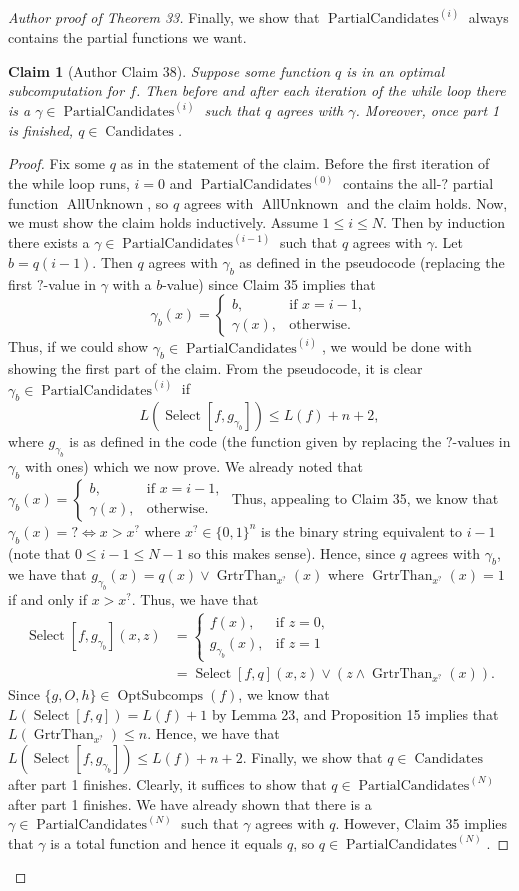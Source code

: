\documentclass[10pt,a4paper]{article}
\newtheorem{ntclaim}[nttheorem]{Claim}
\newcommand{\Opt}{\operatorname{OptSubcomps}}
\newcommand{\Select}{\operatorname{Select}}
\newcommand{\PC}[1]{\operatorname{PartialCandidates}^{(#1)}}
\newcommand{\Candidates}{\operatorname{Candidates}}
\begin{document}
\begin{proof}[Author proof of Theorem 33]
Finally, we show that $\PC{i}$ always contains the partial functions we want.
\begin{ntclaim}[Author Claim 38]
Suppose some function $q$ is in an optimal subcomputation for $f$. Then before and after each iteration of the while loop there is a $\gamma\in\PC{i}$ such that $q$ agrees with $\gamma$. Moreover, once part 1 is finished, $q\in\Candidates$.
\end{ntclaim}
\begin{proof}
Fix some $q$ as in the statement of the claim.
Before the first iteration of the while loop runs, $i=0$ and $\PC{0}$ contains the all-$?$ partial function $\operatorname{AllUnknown}$, so $q$ agrees with $\operatorname{AllUnknown}$ and the claim holds.
Now, we must show the claim holds inductively. Assume $1\leq i\leq N$. Then by induction there exists a $\gamma\in\PC{i-1}$ such that $q$ agrees with $\gamma$. Let $b=q(i-1)$. Then $q$ agrees with $\gamma_b$ as defined in the pseudocode (replacing the first $?$-value in $\gamma$ with a $b$-value) since Claim 35 implies that
\[\gamma_b(x)=\begin{cases}b,&\text{if }x=i-1,\\\gamma(x),&\text{otherwise}.\end{cases}\]
Thus, if we could show $\gamma_b\in\PC{i}$, we would be done with showing the first part of the claim. From the pseudocode, it is clear $\gamma_b\in\PC{i}$ if
\[L(\Select[f,g_{\gamma_b}])\leq L(f)+n+2,\]
where $g_{\gamma_b}$ is as defined in the code (the function given by replacing the $?$-values in $\gamma_b$ with ones) which we now prove.
We already noted that $\gamma_b(x)=\begin{cases}b,&\text{if }x=i-1,\\\gamma(x),&\text{otherwise}.\end{cases}$ Thus, appealing to Claim 35, we know that $\gamma_b(x)=?\Longleftrightarrow x>x^?$ where $x^?\in\{0,1\}^n$ is the binary string equivalent to $i-1$ (note that $0\leq i-1\leq N-1$ so this makes sense). Hence, since $q$ agrees with $\gamma_b$, we have that $g_{\gamma_b}(x)=q(x)\lor\operatorname{GrtrThan}_{x^?}(x)$ where $\operatorname{GrtrThan}_{x^?}(x)=1$ if and only if $x>x^?$.
Thus, we have that
\begin{align*}\Select[f,g_{\gamma_b}](x,z)&=\begin{cases}f(x),&\text{if }z=0,\\g_{\gamma_b}(x),&\text{if }z=1\end{cases}\\&=\Select[f,q](x,z)\lor(z\land\operatorname{GrtrThan}_{x^?}(x)).\end{align*}
Since $\{g,O,h\}\in\Opt(f)$, we know that $L(\Select[f,q])=L(f)+1$ by Lemma 23, and Proposition 15 implies that $L(\operatorname{GrtrThan}_{x^?})\leq n$. Hence, we have that $L(\Select[f,g_{\gamma_b}])\leq L(f)+n+2$.
Finally, we show that $q\in\Candidates$ after part 1 finishes. Clearly, it suffices to show that $q\in\PC{N}$ after part 1 finishes. We have already shown that there is a $\gamma\in\PC{N}$ such that $\gamma$ agrees with $q$. However, Claim 35 implies that $\gamma$ is a total function and hence it equals $q$, so $q\in\PC{N}$.
\end{proof}


\end{proof}
\end{document}
